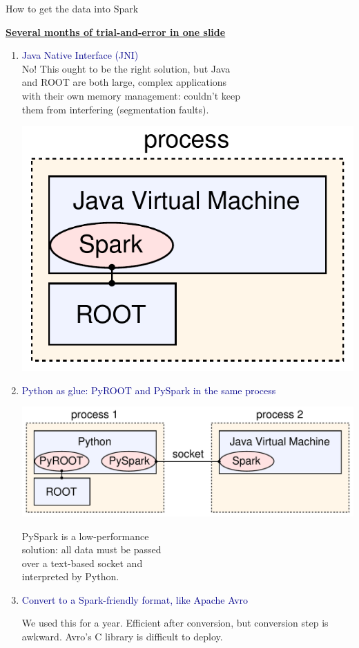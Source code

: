 \documentclass[aspectratio=169]{beamer}
\begin{document}
\begin{frame}{How to get the data into Spark}
\vspace{0.5 cm}
\small

\underline{\large \bf Several months of trial-and-error in one slide}
\begin{center}
\begin{minipage}{0.8\linewidth}
\begin{enumerate}
\item \textcolor{darkblue}{Java Native Interface (JNI)} \\ No! This ought to be the right solution, but Java \\ and ROOT are both large, complex applications \\ with their own memory management: couldn't keep \\ them from interfering (segmentation faults).

\vspace{-2.2 cm}
\hfill \includegraphics[height=1.65 cm]{root-spark.pdf}

\vspace{0.5 cm}
\item \textcolor{darkblue}{\normalsize Python as glue: PyROOT and PySpark in the same process}

\hfill \includegraphics[height=1.65 cm]{pyroot-pyspark.pdf}

\vspace{-1.8 cm}
PySpark is a low-performance \\ solution: all data must be passed \\ over a text-based socket and \\ interpreted by Python.

\item \textcolor{darkblue}{\normalsize Convert to a Spark-friendly format, like Apache Avro}

We used this for a year. Efficient after conversion, but conversion step is awkward. Avro's C library is difficult to deploy.
\end{enumerate}
\end{minipage}
\end{center}


\end{frame}
\end{document}
